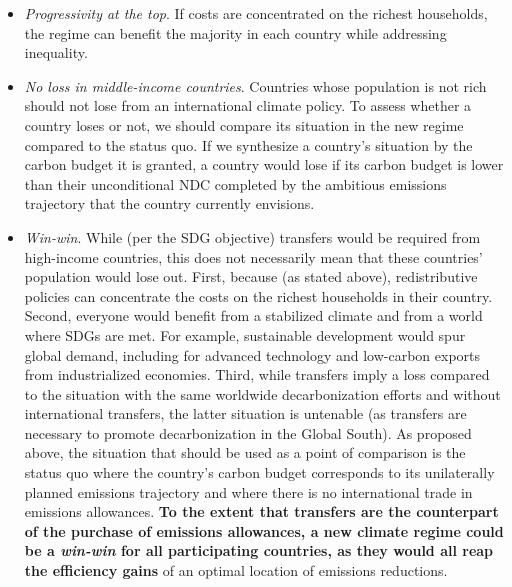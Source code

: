 \documentclass[12pt,english]{article}
\begin{document}
\begin{itemize}
  \begin{itemize}
    \item \textit{Progressivity at the top}. If costs are concentrated on the richest households, the regime can benefit the majority in each country while addressing %
    inequality.
    \item \textit{No loss in middle-income countries}. Countries whose population is not rich should not lose from an international climate policy. To assess whether a country loses or not, we should compare its situation in the new regime compared to the status quo. If we synthesize a country's situation by the carbon budget it is granted, a country would lose if its carbon budget is lower than their unconditional NDC completed by the ambitious emissions trajectory that the country currently envisions. %
    \item \textit{Win-win}. While (per the SDG objective) transfers would be required from high-income countries, this does not necessarily mean that these countries' population would lose out. First, because (as stated above), redistributive policies can concentrate the costs on the richest households in their country. Second, everyone would benefit from a stabilized climate and from a world where SDGs are met. For example, sustainable development would spur global demand, including for advanced technology and low-carbon exports from industrialized economies. Third, while transfers imply a loss compared to the situation with the same worldwide decarbonization efforts and without international transfers, the latter situation is untenable (as transfers are necessary to promote decarbonization in the Global South). As proposed above, the situation that should be used as a point of comparison is the status quo where the country's carbon budget corresponds to its unilaterally planned emissions trajectory and where there is no international trade in emissions allowances. \textbf{To the extent that transfers are the counterpart of the purchase of emissions allowances, a new climate regime could be a \textit{win-win} for all participating countries, as they would all reap the efficiency gains} of an optimal location of emissions reductions.
  \end{itemize}
\end{itemize}
\end{document}
